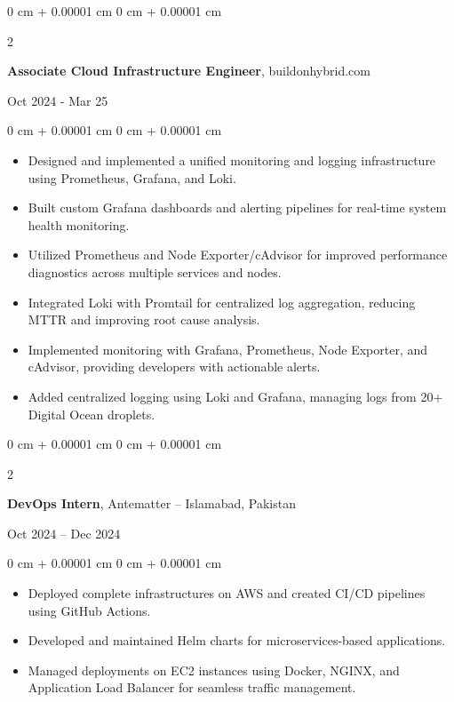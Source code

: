 \documentclass[10pt, letterpaper]{article}
\newenvironment{highlights}{
    \begin{itemize}[
        topsep=0.10 cm,
        parsep=0.10 cm,
        partopsep=0pt,
        itemsep=0pt,
        leftmargin=0 cm + 10pt
    ]
}{
    \end{itemize}
}
\newenvironment{onecolentry}{
    \begin{adjustwidth}{
        0 cm + 0.00001 cm
    }{
        0 cm + 0.00001 cm
    }
}{
    \end{adjustwidth}
}
\newenvironment{twocolentry}[2][]{
    \onecolentry
    \def\secondColumn{#2}
    \setcolumnwidth{\fill, 4.5 cm}
    \begin{paracol}{2}
}{
    \switchcolumn \raggedleft \secondColumn
    \end{paracol}
    \endonecolentry
}
\begin{document}
\vspace{0.10 cm}

\begin{twocolentry}{Oct 2024 - Mar 25}
    \textbf{Associate Cloud Infrastructure Engineer}, buildonhybrid.com
\end{twocolentry}
\vspace{0.10 cm}
\begin{onecolentry}
    \begin{highlights}
        \item Designed and implemented a unified monitoring and logging infrastructure using Prometheus, Grafana, and Loki.
        \item Built custom Grafana dashboards and alerting pipelines for real-time system health monitoring.
        \item Utilized Prometheus and Node Exporter/cAdvisor for improved performance diagnostics across multiple services and nodes.
        \item Integrated Loki with Promtail for centralized log aggregation, reducing MTTR and improving root cause analysis.
        \item Implemented monitoring with Grafana, Prometheus, Node Exporter, and cAdvisor, providing developers with actionable alerts.
        \item Added centralized logging using Loki and Grafana, managing logs from 20+ Digital Ocean droplets.
    \end{highlights}
\end{onecolentry}

\vspace{0.10 cm}

\begin{twocolentry}{Oct 2024 – Dec 2024}
    \textbf{DevOps Intern}, Antematter – Islamabad, Pakistan
\end{twocolentry}
\vspace{0.10 cm}
\begin{onecolentry}
    \begin{highlights}
        \item Deployed complete infrastructures on AWS and created CI/CD pipelines using GitHub Actions.
        \item Developed and maintained Helm charts for microservices-based applications.
        \item Managed deployments on EC2 instances using Docker, NGINX, and Application Load Balancer for seamless traffic management.
    \end{highlights}
\end{onecolentry}
\end{document}
